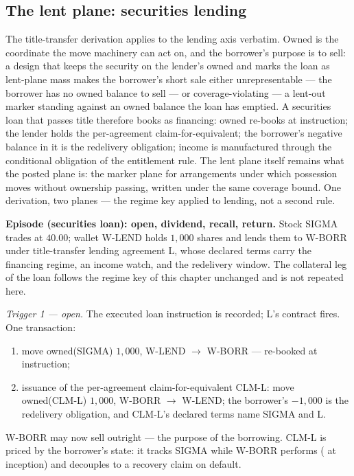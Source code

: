 \subsection{The lent plane: securities lending}

The title-transfer derivation applies to the lending axis verbatim. Owned is
the coordinate the move machinery can act on, and the borrower's purpose is to
sell: a design that keeps the security on the lender's owned and marks the
loan as lent-plane mass makes the borrower's short sale either unrepresentable
--- the borrower has no owned balance to sell --- or coverage-violating ---
a lent-out marker standing against an owned balance the loan has emptied. A
securities loan that passes title therefore books as financing: owned re-books
at instruction; the lender holds the per-agreement claim-for-equivalent; the
borrower's negative balance in it is the redelivery obligation; income is
manufactured through the conditional obligation of the entitlement rule. The
lent plane itself remains what the posted plane is: the marker plane for
arrangements under which possession moves without ownership passing, written
under the same coverage bound. One derivation, two planes --- the regime key
applied to lending, not a second rule.

\medskip\noindent\textbf{Episode (securities loan): open, dividend, recall,
return.} Stock SIGMA trades at $40.00$; wallet W-LEND holds $1{,}000$ shares
and lends them to W-BORR under title-transfer lending agreement L, whose
declared terms carry the financing regime, an income watch, and the redelivery
window. The collateral leg of the loan follows the regime key of this chapter
unchanged and is not repeated here.

\emph{Trigger 1 --- open.} The executed loan instruction is recorded; L's
contract fires. One transaction:
\begin{enumerate}[label=(\arabic*),nosep]
\item move owned(SIGMA) $1{,}000$, W-LEND $\to$ W-BORR --- re-booked at
instruction;
\item issuance of the per-agreement claim-for-equivalent CLM-L: move
owned(CLM-L) $1{,}000$, W-BORR $\to$ W-LEND; the borrower's $-1{,}000$ is the
redelivery obligation, and CLM-L's declared terms name SIGMA and L.
\end{enumerate}
W-BORR may now sell outright --- the purpose of the borrowing. CLM-L is
priced by the borrower's state: it tracks SIGMA while W-BORR performs
( at inception) and decouples to a recovery claim on default.

